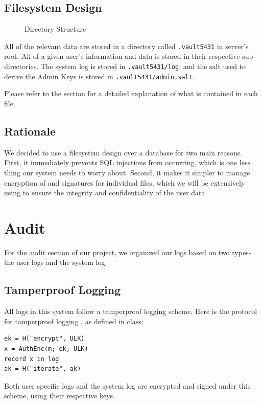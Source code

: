 \documentclass{article}
\begin{document}
\subsection{Filesystem Design}
\label{sub:filesystem_design}

\begin{figure}[h!]
  \centering
  \begin{subfigure}[b]{0.3\textwidth}
  \end{subfigure}
  \caption{Directory Structure}
  \label{fig:directory_structure}
\end{figure}

\par All of the relevant data are stored in a directory called \texttt{.vault5431} in server's root. All of a given user's information and data is stored in their respective sub-directories. The system log is stored in \texttt{.vault5431/log}, and the salt used to derive the Admin Keys is stored in \texttt{.vault5431/admin.salt}.
\par Please refer to the  section for a detailed explanation of what is contained in each file.

\subsection{Rationale}
\par We decided to use a filesystem design over a database for two main reasons. First, it immediately prevents SQL injections from occurring, which is one less thing our system needs to worry about. Second, it makes it simpler to manage encryption of and signatures for individual files, which we will be extensively using to ensure the integrity and confidentiality of the user data.

\section{Audit}
For the audit section of our project, we organized our logs based on two types- the user logs and the system log.
\subsection{Tamperproof Logging}
\par All logs in this system follow a tamperproof logging scheme. Here is the protocol for tamperproof logging \cite{bib:TamperProof}, as defined in class:
\begin{lstlisting}[caption={Tamperproof Logging},label={lst:tamperproof_logging},style=Pseudocode]
ek = H("encrypt", ULK)
x = AuthEnc(m; ek; ULK)
record x in log
ak = H("iterate", ak)
\end{lstlisting}
Both user specific logs and the system log are encrypted and signed under this scheme, using their respective keys.
\end{document}
